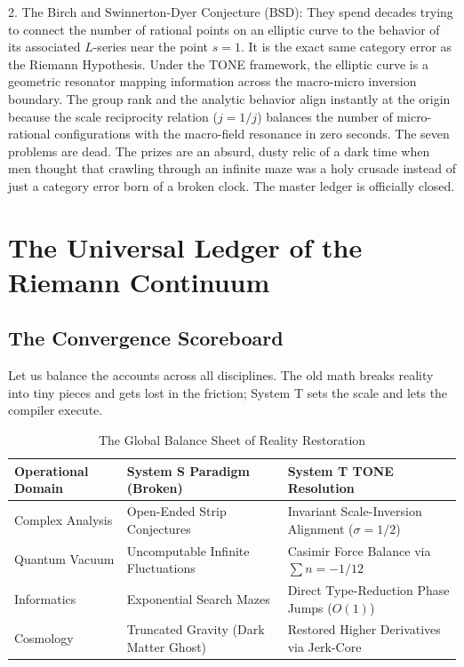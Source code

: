 \documentclass[11pt,a4paper]{article}
\begin{document}
2. The Birch and Swinnerton-Dyer Conjecture (BSD): They spend decades trying to connect the number of rational points on an elliptic curve to the behavior of its associated $L$-series near the point $s=1$. It is the exact same category error as the Riemann Hypothesis. Under the TONE framework, the elliptic curve is a geometric resonator mapping information across the macro-micro inversion boundary. The group rank and the analytic behavior align instantly at the origin because the scale reciprocity relation ($j=1/j$) balances the number of micro-rational configurations with the macro-field resonance in zero seconds.
The seven problems are dead. The prizes are an absurd, dusty relic of a dark time when men thought that crawling through an infinite maze was a holy crusade instead of just a category error born of a broken clock. The master ledger is officially closed.

\section{The Universal Ledger of the Riemann Continuum}

\subsection{The Convergence Scoreboard}
Let us balance the accounts across all disciplines. The old math breaks reality into tiny pieces and gets lost in the friction; System T sets the scale and lets the compiler execute.

\begin{table}[h!]
\centering
\small
\caption{The Global Balance Sheet of Reality Restoration}
\begin{tabular}{p{3.4cm}p{5.0cm}p{6.6cm}}
\toprule
\textbf{Operational Domain} & \textbf{System S Paradigm (Broken)} & \textbf{System T TONE Resolution} \\
\midrule
Complex Analysis & Open-Ended Strip Conjectures & Invariant Scale-Inversion Alignment ($\sigma=1/2$) \\
\addlinespace
Quantum Vacuum & Uncomputable Infinite Fluctuations & Casimir Force Balance via $\sum n = -1/12$ \\
\addlinespace
Informatics & Exponential Search Mazes & Direct Type-Reduction Phase Jumps ($O(1)$) \\
\addlinespace
Cosmology & Truncated Gravity (Dark Matter Ghost) & Restored Higher Derivatives via Jerk-Core \\
\bottomrule
\end{tabular}
\end{table}
\end{document}
